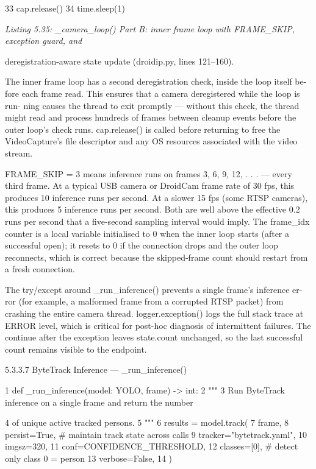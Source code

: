 33 cap.release()
34 time.sleep(1)


\textit{Listing 5.35: \_camera\_loop() Part B: inner frame loop with FRAME\_SKIP, exception guard, and}

deregistration-aware state update (droidip.py, lines 121--160).


The inner frame loop has a second deregistration check, inside the loop itself be-
fore each frame read. This ensures that a camera deregistered while the loop is run-
ning causes the thread to exit promptly --- without this check, the thread might read and
process hundreds of frames between cleanup events before the outer loop's check runs.
cap.release() is called before returning to free the VideoCapture's ﬁle descriptor and
any OS resources associated with the video stream.

FRAME\_SKIP = 3 means inference runs on frames 3, 6, 9, 12, . . . --- every third frame.
At a typical USB camera or DroidCam frame rate of 30 fps, this produces 10 inference runs
per second. At a slower 15 fps (some RTSP cameras), this produces 5 inference runs per
second. Both are well above the effective 0.2 runs per second that a ﬁve-second sampling
interval would imply. The frame\_idx counter is a local variable initialised to 0 when the
inner loop starts (after a successful open); it resets to 0 if the connection drops and the outer
loop reconnects, which is correct because the skipped-frame count should restart from a
fresh connection.

The try/except around \_run\_inference() prevents a single frame's inference er-
ror (for example, a malformed frame from a corrupted RTSP packet) from crashing the
entire camera thread. logger.exception() logs the full stack trace at ERROR level,
which is critical for post-hoc diagnosis of intermittent failures. The continue after the
exception leaves state.count unchanged, so the last successful count remains visible to
the endpoint.


5.3.3.7 ByteTrack Inference --- \_run\_inference()

1 def \_run\_inference(model: YOLO, frame) -> int:
2 """
3 Run ByteTrack inference on a single frame and return the number




4 of unique active tracked persons.
5 """
6 results = model.track(
7 frame,
8 persist=True, \# maintain track state across calls
9 tracker="bytetrack.yaml",
10 imgsz=320,
11 conf=CONFIDENCE\_THRESHOLD,
12 classes=[0], \# detect only class 0 = person
13 verbose=False,
14 )


